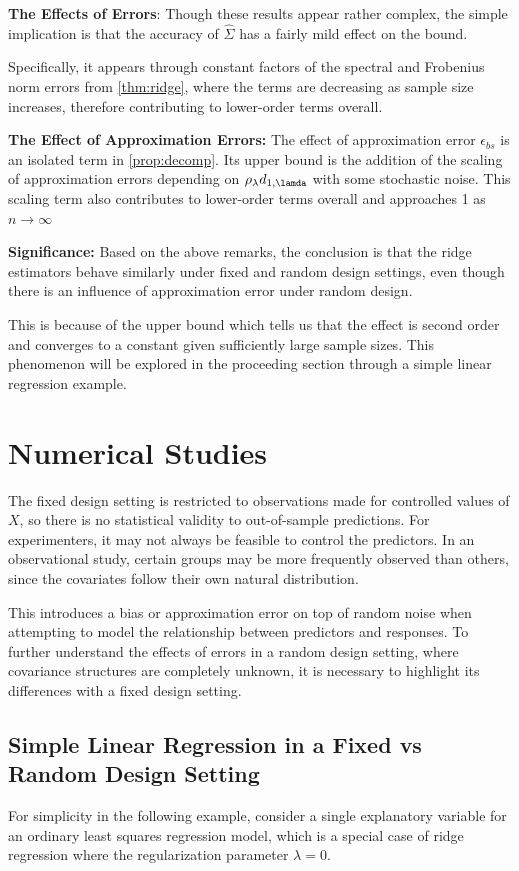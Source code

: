 \documentclass[nohyperref]{article}
\theoremstyle{plain}
\theoremstyle{definition}
\theoremstyle{remark}
\begin{document}
\textbf{The Effects of Errors}: Though these results appear rather complex, the simple implication is that the accuracy of $\hat{\Sigma}$ has a fairly mild effect on the bound. 

Specifically, it appears through constant factors of the spectral and Frobenius norm errors from \cref{thm:ridge}, where the terms are decreasing as sample size increases, therefore contributing to lower-order terms overall.

\textbf{The Effect of Approximation Errors:} The effect of approximation error $\epsilon_{bs}$ is an isolated term in \cref{prop:decomp}. Its upper bound is the addition of the scaling of approximation errors depending on $\rho_\lambda d_{1,\lamda}$ with some stochastic noise. This scaling term also contributes to lower-order terms overall and approaches 1 as $n \rightarrow \infty$ 

\textbf{Significance:} Based on the above remarks, the conclusion is that the ridge estimators behave similarly under fixed and random design settings, even though there is an influence of approximation error under random design. 

This is because of the upper bound which tells us that the effect is second order and converges to a constant given sufficiently large sample sizes. This phenomenon will be explored in the proceeding section through a simple linear regression example.






\section{Numerical Studies}
The fixed design setting is restricted to observations made for controlled values of $X$, so there is no statistical validity to out-of-sample predictions. For experimenters, it may not always be feasible to control the predictors. In an observational study, certain groups may be more frequently observed than others, since the covariates follow their own natural distribution. 

This introduces a bias or approximation error on top of random noise when attempting to model the relationship between predictors and responses. To further understand the effects of errors in a random design setting, where covariance structures are completely unknown, it is necessary to highlight its differences with a fixed design setting.


\subsection{Simple Linear Regression in a Fixed vs Random Design Setting}
For simplicity in the following example, consider a single explanatory variable for an ordinary least squares regression model, which is a special case of ridge regression where the regularization parameter $\lambda=0$.
\end{document}
